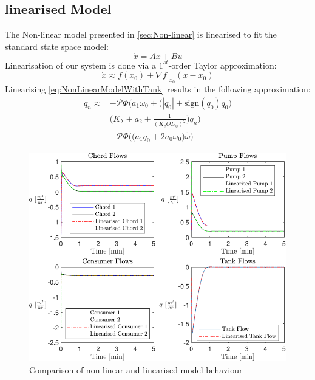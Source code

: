 \subsection{linearised Model}
The Non-linear model presented in \cref{sec:Non-linear} is linearised to fit the standard state space model:
\begin{equation*}
	\dot{x}=Ax+Bu
\end{equation*}
Linearisation of our system is done via a $ 1^{st} $-order Taylor approximation: 
\begin{equation}\label{eq:TaylorSeries}
	\dot{x} \approx f(x_0) + \nabla f\bigg\rvert_{x_0} (x-x_0)
\end{equation}
Linearising \cref{eq:NonLinearModelWithTank} results in the following approximation:
\begin{equation}\label{eq:LinearisedModelWithTank}
	\begin{split}
	\dot{q}_n \approx &-\mathcal{P}\Phi\Bigg(a_1\omega_0 + \Big(|q_0|+\text{sign}(q_0)q_0\Big)\\
	&\Bigg(K_\lambda + a_2 + \frac{1}{(K_v OD_0)^2}\Bigg) \tilde{q}_n \Bigg)\\
	&- \mathcal{P}\Phi\Bigg(\Big(a_1 q_0 + 2a_0\omega_0\Big) \tilde{\omega}\Bigg)
	\end{split}
\end{equation}

\begin{figure}[h]
	\centering
	\includegraphics[width=\linewidth]{Graphics/NominalFlows.pdf}
	\caption{Comparison of non-linear and linearised model behaviour}
	\label{fig:CompNonlinLin}
\end{figure}